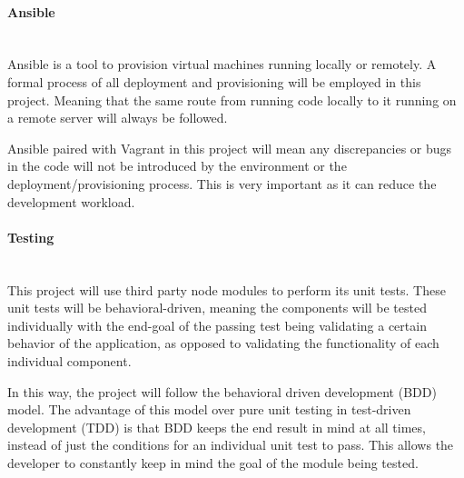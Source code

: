 \paragraph{Ansible}\mbox{}\\
Ansible is a tool to provision virtual machines running locally or remotely. A formal process of all deployment and provisioning will be employed in this project. Meaning that the same route from running code locally to it running on a remote server will always be followed.

Ansible paired with Vagrant in this project will mean any discrepancies or bugs in the code will not be introduced by the environment or the deployment/provisioning process. This is very important as it can reduce the development workload. 

\paragraph{Testing}\mbox{}\\
This project will use third party node modules to perform its unit tests. These unit tests will be behavioral-driven, meaning the components will be tested individually with the end-goal of the passing test being validating a certain behavior of the application, as opposed to validating the functionality of each individual component.

In this way, the project will follow the behavioral driven development (BDD) model. The advantage of this model over pure unit testing in test-driven development (TDD) is that BDD keeps the end result in mind at all times, instead of just the conditions for an individual unit test to pass. This allows the developer to constantly keep in mind the goal of the module being tested.
